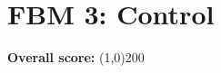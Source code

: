 \section*{FBM 3: Control}


\vspace{0.5cm}


\vspace{0.2cm}


\begin{flushleft}
\textbf{Overall score:} \line(1,0){200}\\
\vspace{0.3cm}
\end{flushleft}




